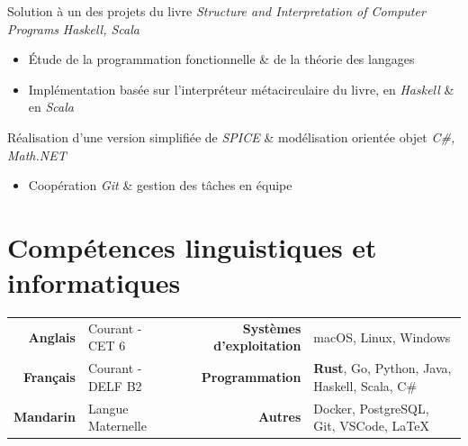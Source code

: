\documentclass{resume}
\begin{document}
Solution à un des projets du livre \textit{Structure and Interpretation of Computer Programs} \hfill \textit{Haskell, Scala}
\begin{itemize}
  \item Étude de la programmation fonctionnelle \& de la théorie des langages
  \item Implémentation basée sur l'interpréteur métacirculaire du livre, en \textit{Haskell} \& en \textit{Scala}
\end{itemize}

Réalisation d’une version simplifiée de \textit{SPICE} \& modélisation orientée objet \hfill \textit{C\#, Math.NET}
\begin{itemize}
  \item Coopération \textit{Git} \& gestion des tâches en équipe
\end{itemize}


\section{Compétences linguistiques et informatiques}

\begin{tabular}{r l r l}
  \textbf{Anglais}                 & Courant - CET 6                                      &
  \textbf{Systèmes d'exploitation} & macOS, Linux, Windows                                  \\
  \textbf{Français}                & Courant - DELF B2                                    &
  \textbf{Programmation}           & \textbf{Rust}, Go, Python, Java, Haskell, Scala, C\#   \\
  \textbf{Mandarin}                & Langue Maternelle                                    &
  \textbf{Autres}                  & Docker, PostgreSQL, Git, VSCode, \LaTeX
\end{tabular}
\end{document}

